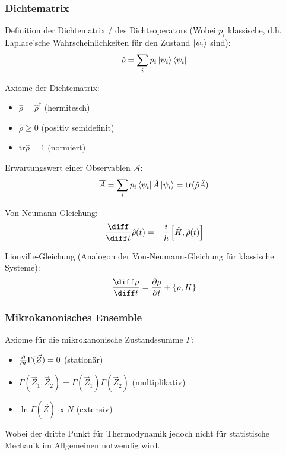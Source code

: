 \documentclass[11pt]{article}
\numberwithin{equation}{section}
\begin{document}
			\subsubsection{Dichtematrix}
				\noindent
				Definition der Dichtematrix / des Dichteoperators (Wobei $p_i$ klassische, d.h. Laplace'sche Wahrscheinlichkeiten für den Zustand $\Ket{\psi_i}$ sind):
				\begin{equation}
					\hat{\rho} = \sum_i p_i \Ket{\psi_i}\Bra{\psi_i}
				\end{equation}

				\noindent
				Axiome der Dichtematrix:
				\begin{itemize}\itemsep -0pt	%
					\item $\hat{\rho} = \hat{\rho}^\dagger$ \hfill{(hermitesch)}
					\item $\hat{\rho} \ge 0 $ \hfill{(positiv semidefinit)}
					\item $\mathrm{tr} \hat{\rho} = 1$ \hfill{(normiert)}
				\end{itemize}

				\noindent
				Erwartungswert einer Observablen $\mathcal{A}$:
				\begin{equation}
					\overline{A} = \sum_i p_i \Bra{\psi_i}\hat{A}\Ket{\psi_i} = \mathrm{tr} (\hat{\rho}\hat{A})
				\end{equation}

				\noindent
				Von-Neumann-Gleichung:
				\begin{equation}
					\tder{}{t}\hat{\rho}(t) = -\frac{i}{\hbar} \com{\hat{H}}{\hat{\rho}(t)}
				\end{equation}

				\noindent
				Liouville-Gleichung (Analogon der Von-Neumann-Gleichung für klassische Systeme):
				\begin{equation}
					\tder{\rho}{t} = \pder{\rho}{t}+\cBr{\rho,H}
				\end{equation}

			\subsubsection{Mikrokanonisches Ensemble}
				\noindent
				Axiome für die mikrokanonische Zustandssumme $\Gamma$:
				\begin{itemize}\itemsep -0pt	%
					\item $\frac{\partial }{\partial t}\Gamma(\vec{Z}) = 0$ \hfill{(stationär)}
					\item $\Gamma(\vec{Z}_1,\vec{Z}_2) = \Gamma(\vec{Z}_1)\Gamma(\vec{Z}_2) $ \hfill{(multiplikativ)}
					\item $\ln\Gamma(\vec{Z}) \propto N$ \hfill{(extensiv)}
				\end{itemize}
				Wobei der dritte Punkt für Thermodynamik jedoch nicht für statistische Mechanik im Allgemeinen notwendig wird.
\end{document}
